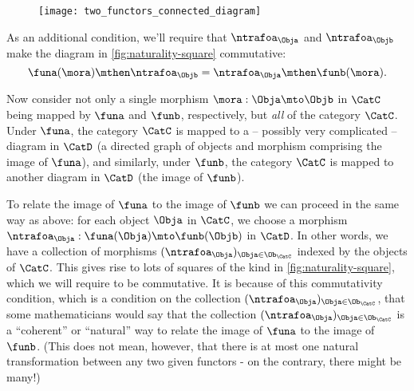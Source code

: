 %
\begin{figure}[h!]
    \texttt{[image: two\_functors\_connected\_diagram]}
    \caption{}
    \label{fig:two-functors-connected-diagram}
\end{figure}
%

As an additional condition, we'll require that  $\ntrafoa_\Obja$ and $\ntrafoa_\Objb$ make the diagram in \cref{fig:naturality-square} commutative:
\begin{equation}
    \funa(\mora) \mthen \ntrafoa_\Objb = \ntrafoa_\Obja \mthen \funb(\mora).
\end{equation}

%
\begin{marginfigure}
    \centering
    \caption{}
    \label{fig:naturality-square}
\end{marginfigure}
%

Now consider not only a single morphism $\mora : \Obja \mto \Objb$ in $\CatC$ being mapped by $\funa$ and $\funb$, respectively, but \emph{all} of the category $\CatC$.
Under $\funa$, the category $\CatC$ is mapped to a -- possibly very complicated --  diagram in $\CatD$ (a directed graph of objects and morphism comprising the image of $\funa$), and similarly, under $\funb$, the category $\CatC$ is mapped to another diagram in $\CatD$ (the image of $\funb$).

To relate the image of $\funa$ to the image of $\funb$ we can proceed in the same way as above: for each object $\Obja$ in $\CatC$, we choose a morphism $\ntrafoa_\Obja : \funa(\Obja) \mto \funb(\Objb)$ in $\CatD$.
In other words, we have a collection of morphisms $(\ntrafoa_\Obja)_{\Obja \in \Ob_\CatC}$ indexed by the objects of $\CatC$.
This gives rise to lots of squares of the kind in \cref{fig:naturality-square}, which we will require to be commutative.
It is because of this commutativity condition, which is a condition on the collection $(\ntrafoa_\Obja)_{\Obja \in \Ob_\CatC}$, that some mathematicians would say that the collection $(\ntrafoa_\Obja)_{\Obja \in \Ob_\CatC}$ is a ``coherent'' or ``natural'' way to relate the image of $\funa$ to the image of $\funb$.
(This does not mean, however, that there is at most one natural transformation between any two given functors - on the contrary, there might be many!)

